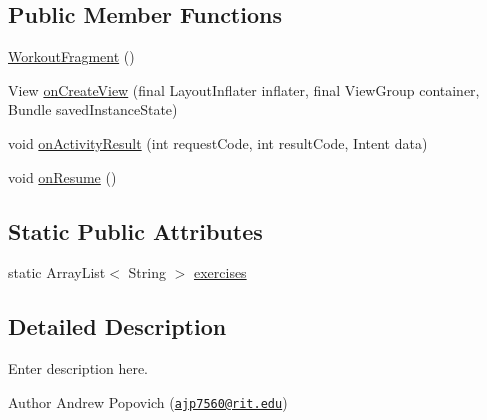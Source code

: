 \subsection*{Public Member Functions}
\begin{DoxyCompactItemize}
\item 
\hyperlink{classcom_1_1example_1_1workoutcompanion_1_1_workout_fragment_a85464c2f9e2c1220dc0de8fa0422d08f}{Workout\-Fragment} ()
\item 
View \hyperlink{classcom_1_1example_1_1workoutcompanion_1_1_workout_fragment_aa3decf39daf378191921b78c0a9189b1}{on\-Create\-View} (final Layout\-Inflater inflater, final View\-Group container, Bundle saved\-Instance\-State)
\item 
void \hyperlink{classcom_1_1example_1_1workoutcompanion_1_1_workout_fragment_a79e33c2b0472df38c258b382cc7ee51e}{on\-Activity\-Result} (int request\-Code, int result\-Code, Intent data)
\item 
void \hyperlink{classcom_1_1example_1_1workoutcompanion_1_1_workout_fragment_ab007d6be1afb2253a8f1d7a70785d595}{on\-Resume} ()
\end{DoxyCompactItemize}
\subsection*{Static Public Attributes}
\begin{DoxyCompactItemize}
\item 
static Array\-List$<$ String $>$ \hyperlink{classcom_1_1example_1_1workoutcompanion_1_1_workout_fragment_aae03d3b441ba1116d4af94c814f06f88}{exercises}
\end{DoxyCompactItemize}


\subsection{Detailed Description}
Enter description here.

\begin{DoxyAuthor}{Author}
Andrew Popovich (\href{mailto:ajp7560@rit.edu}{\tt ajp7560@rit.\-edu}) 
\end{DoxyAuthor}


